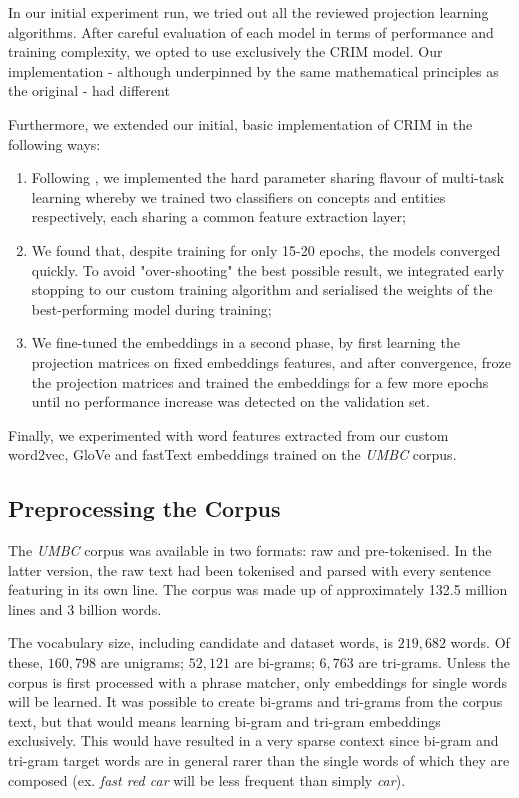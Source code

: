 In our initial experiment run, we tried out all the reviewed projection learning algorithms.  After careful evaluation of each model in terms of performance and training complexity, we opted to use exclusively the CRIM model.  Our implementation - although underpinned by the same mathematical principles as the original - had different 

Furthermore, we extended our initial, basic implementation of CRIM in the following ways:
\begin{enumerate}
    \item Following \citep{bernier2018crim}, we implemented the hard parameter sharing flavour of multi-task learning \citep{ruder2017overview} whereby we trained two classifiers on concepts and entities respectively, each sharing a common feature extraction layer;
    \item We found that, despite training for only 15-20 epochs, the models converged quickly. To avoid "over-shooting" the best possible result, we integrated early stopping to our custom training algorithm and serialised the weights of the best-performing model during training;
    \item We fine-tuned the embeddings in a second phase, by first learning the projection matrices on fixed embeddings features, and after convergence, froze the projection matrices and trained the embeddings for a few more epochs until no performance increase was detected on the validation set.
\end{enumerate}
Finally, we experimented with word features extracted from our custom word2vec, GloVe and fastText embeddings trained on the \textit{UMBC} corpus.  

\subsection{Preprocessing the Corpus} \label{semeval_preprocessing}
The \textit{UMBC} corpus was available in two formats: raw and pre-tokenised.  In the latter version, the raw text had been tokenised and parsed with every sentence featuring in its own line.  The corpus was made up of approximately 132.5 million lines and 3 billion words. 

The vocabulary size, including candidate and dataset words, is $219,682$ words.  Of these, $160,798$ are unigrams; $52,121$ are bi-grams; $6,763$ are tri-grams.  Unless the corpus is first processed with a phrase matcher, only embeddings for single words will be learned.  It was possible to create bi-grams and tri-grams from the corpus text, but that would means learning bi-gram and tri-gram embeddings exclusively.  This would have resulted in a very sparse context since bi-gram and tri-gram target words are in general rarer than the single words of which they are composed (ex. \textit{fast red car} will be less frequent than simply \textit{car}).  

